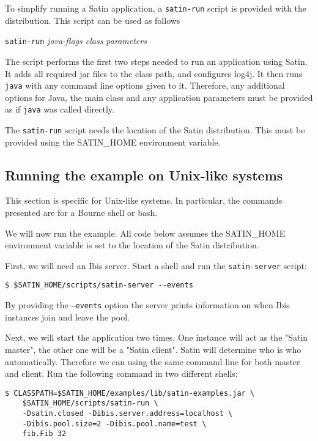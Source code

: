 \documentclass[a4paper,10pt]{article}
\begin{document}
To simplify running a Satin application, a \texttt{satin-run} script is
provided with the distribution. This script can be
used as follows

\begin{center}
\texttt{satin-run} \emph{java-flags class parameters}
\end{center}

The script performs the first two steps needed to run an application
using Satin. It adds all required jar files
to the class path, and configures log4j.
It then runs \texttt{java} with any
command line options given to it. Therefore, any additional options for
Java, the main class and any application parameters must be provided as
if \texttt{java} was called directly.

The \texttt{satin-run} script needs the location of the Satin
distribution. This must be provided using the SATIN\_HOME environment
variable.

\subsection{Running the example on Unix-like systems}

This section is specific for Unix-like systems. In particular, the
commands presented are for a Bourne shell or bash.

We will now run the example. All code below assumes the SATIN\_HOME
environment variable is set to the location of the Satin distribution.

First, we will need an Ibis server. Start a shell and
run the \texttt{satin-server} script:
\noindent
{\small
\begin{verbatim}
$ $SATIN_HOME/scripts/satin-server --events
\end{verbatim}
}
\noindent

By providing the \texttt{--events} option the server
prints information on when Ibis instances join and leave the pool.

Next, we will start the application two times. One instance will act as the
"Satin master", the other one will be a "Satin client".
Satin will determine who is who automatically. Therefore we can using the same
command line for both master and client.
Run the following command in two different shells:

\noindent
{\small
\begin{verbatim}
$ CLASSPATH=$SATIN_HOME/examples/lib/satin-examples.jar \
    $SATIN_HOME/scripts/satin-run \
    -Dsatin.closed -Dibis.server.address=localhost \
    -Dibis.pool.size=2 -Dibis.pool.name=test \
    fib.Fib 32
\end{verbatim}
}
\noindent
\end{document}
